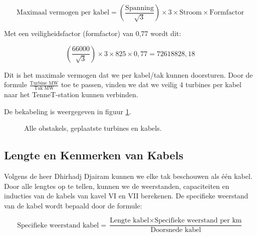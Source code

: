 \begin{equation} \label{eq:26}
\text{{Maximaal vermogen per kabel}} = \left(\frac{{\text{{Spanning}}}}{{\sqrt{3}}}\right) \times 3 \times \text{{Stroom}} \times \text{{Formfactor}}
\end{equation} 

Met een veiligheidsfactor (formfactor) van 0,77 wordt dit:

\begin{equation} \label{eq:27}
\left(\frac{{66000}}{{\sqrt{3}}}\right) \times 3 \times 825 \times 0,77 = 72618828,18
\end{equation} 

Dit is het maximale vermogen dat we per kabel/tak kunnen doorsturen. Door de formule \(\frac{{\text{{Turbine MW}}}}{{\text{{Tak MW}}}}\) toe te passen, vinden we dat we veilig 4 turbines per kabel naar het TenneT-station kunnen verbinden.

De bekabeling is weergegeven in figuur \ref{fig:windparktotaal}.

\begin{figure}[H]
    \centering
    \setlength{\fboxsep}{0pt}  %
    \colorbox{darkgray}{}
    \caption{Alle obstakels, geplaatste turbines en kabels.}
    \label{fig:windparktotaal}
\end{figure}

\subsection{Lengte en Kenmerken van Kabels}
Volgens de heer Dhirhadj Djairam kunnen we elke tak beschouwen als één kabel. Door alle lengtes op te tellen, kunnen we de weerstanden, capaciteiten en inducties van de kabels van kavel VI en VII berekenen. De specifieke weerstand van de kabel wordt bepaald door de formule:

\begin{equation} \label{eq:28}
\text{{Specifieke weerstand kabel}} = \frac{{\text{{Lengte kabel}} \times \text{{Specifieke weerstand per km}}}}{{\text{{Doorsnede kabel}}}}
\end{equation} 

